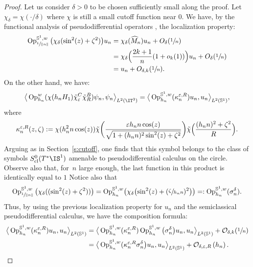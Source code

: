 \documentclass[10pt]{amsart}
\theoremstyle{plain}
\theoremstyle{definition}
\theoremstyle{remark}
\newcommand{\Op}{\operatorname{Op}}
\begin{document}
\begin{proof}
Let us consider $\delta > 0$ to be chosen sufficiently small along the proof. Let $\chi_\delta = \chi(\cdot/\delta)$ where $\chi$ is still a small cutoff function near $0$. We have, by the functional analysis of pseudodifferential operators \cite[Th.\,14.9]{Zworski12}, the localization property:
\begin{align*}
\Op_{\sfrac{1}{\Vert n \Vert}}^{\mathbb{S}^1,w} \big(\chi_\delta(\sin^2(z) + \zeta^2) \big) u_n & = \chi_{\delta}(\widehat{M}_n) u_n + O_\delta(\sfrac{1}{n}) \\
& = \chi_\delta\Bigl(\frac{2k+1}{n}(1+o_k(1))\Bigr) u_n + O_\delta(\sfrac{1}{n}) \\
& = u_n + O_{\delta,k}(\sfrac{1}{n}).
\end{align*}
On the other hand, we have:
\[
\big \langle \Op_{h_n}^w(\chi(h_n H_1) \tilde{\chi}_\varepsilon^C \tilde{\chi}_R^B) \psi_n, \psi_n \big \rangle_{L^2(\IT^3)} = \big \langle \Op_{h_n}^{\mathbb{S}^1,w} (\kappa_n^{\varepsilon,R}) u_n,u_n \big \rangle_{L^2(\mathbb{S}^1)},
\]
where
\[
\kappa_n^{\varepsilon,R}(z,\zeta) := \chi(h_n^2 n \cos(z)) \tilde{\chi} \biggl(\frac{ \varepsilon h_n n \cos(z) }{\sqrt{1 + (h_n n)^2\sin^2(z) + \zeta^2}} \biggr) \tilde{\chi} \Bigl(\frac{ (h_n n)^2 + \zeta^2}{R} \Bigr).
\]
Arguing as in Section~\ref{s:cutoff}, one finds that this symbol belongs to the class of symbols $S^0_{\textup{cl}}(T^*\IS^1)$ amenable to pseudodifferential calculus on the circle. Observe also that, for~$n$ large enough, the last function in this product is identically equal to $1$ Notice also that
\[
\Op_{\sfrac{1}{\Vert n \Vert}}^{\mathbb{S}^1,w} \big(\chi_\delta((\sin^2(z) + \zeta^2)) \big) = \Op_{h_n}^{\mathbb{S}^1,w} \bigl(\chi_\delta\bigl(\sin^2(z) +(\sfrac{\zeta}{h_n n})^2 \bigr) \bigr) =: \Op_{h_n}^{\mathbb{S}^1,w} (\sigma_n^\delta).
\]
Thus, by using the previous localization property for $u_n$ and the semiclassical pseudodifferential calculus, we have the composition formula:
\begin{align*}
\big \langle \Op_{h_n}^{\mathbb{S}^1,w} (\kappa_n^{\varepsilon,R}) u_n,u_n \big \rangle_{L^2(\mathbb{S}^1)} & = \big \langle \Op_{h_n}^{\mathbb{S}^1,w} (\kappa_n^{\varepsilon,R}) \Op_{h_n}^{\mathbb{S}^1,w} \big(\sigma_n^\delta \big) u_n,u_n \big \rangle_{L^2(\mathbb{S}^1)} + \mathcal{O}_{\delta,k}(\sfrac{1}{n}) \\
& = \big \langle \Op_{h_n}^{\mathbb{S}^1,w} (\kappa_n^{\varepsilon,R} \sigma_n^\delta \big) u_n,u_n \big \rangle_{L^2(\mathbb{S}^1)} + \mathcal{O}_{\delta,\varepsilon,R}\left(h_n \right).

\end{align*}
\end{proof}
\end{document}
